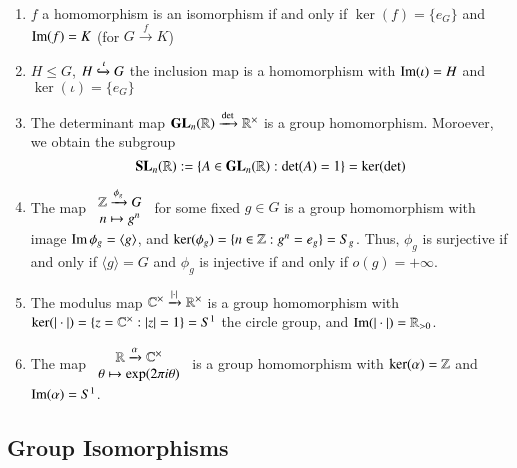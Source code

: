 \documentclass[12pt, a4paper, twoside, openright, titlepage]{book}
\begin{document}
\begin{eg}{}{}
        \leavevmode
        \begin{enumerate}
                \item $f$ a homomorphism is an isomorphism if and only if $\ker(f) = \{e_G\}$ and $\operatorname{Im}(f) = K$ (for $G\xrightarrow{f} K$)
                \item $H \leq G$, $H \xhookrightarrow{\iota} G$ the inclusion map is a homomorphism with $\operatorname{Im}(\iota) = H$ and $\ker(\iota) = \{e_G\}$
                \item The determinant map $\mathbf{GL}_n(\mathbb R)\xrightarrow{\det}\mathbb R^{\times}$ is a group homomorphism. Moroever, we obtain the subgroup \begin{equation}
                                \mathbf{SL}_n(\mathbb R) := \{A \in \mathbf{GL}_n(\mathbb R):\det(A) = 1\} = \ker(\det)
                        \end{equation}
                \item The map $\begin{array}{c} \mathbb Z\xrightarrow{\phi_g} G \\ n \mapsto g^n \end{array}$ for some fixed $g \in G$ is a group homomorphism with image $\operatorname{Im} \phi_g = \langle g \rangle$, and $\ker(\phi_g) = \{n \in \mathbb Z:g^n = e_g\} = S_g$. Thus, $\phi_g$ is surjective if and only if $\langle g\rangle = G$ and $\phi_g$ is injective if and only if $o(g) = +\infty$.
                \item The modulus map $\mathbb C^{\times} \xrightarrow{|\cdot|}\mathbb R^{\times}$ is a group homomorphism with $\ker(|\cdot|) = \{z = \mathbb C^{\times}:|z| = 1\} = S^1$ the circle group, and $\operatorname{Im}(|\cdot|) = \mathbb R_{>0}$.
                \item The map $\begin{array}{c} \mathbb R\xrightarrow{\alpha}\mathbb C^{\times} \\ \theta\mapsto \exp(2\pi i \theta) \end{array}$ is a group homomorphism with $\ker(\alpha) = \mathbb Z$ and $\operatorname{Im}(\alpha) = S^1$.
        \end{enumerate}
\end{eg}




\subsection{\textsection Group Isomorphisms}
\end{document}
